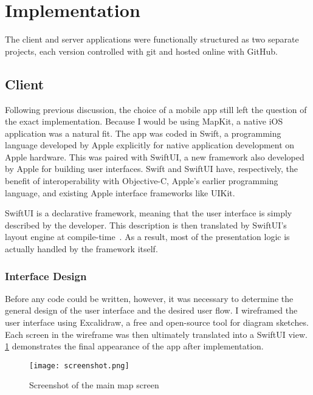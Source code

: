 \section{Implementation}

The client and server applications were functionally structured as two separate projects, each version controlled with \textsf{git} and hosted online with GitHub.  

\subsection{Client}

Following previous discussion, the choice of a mobile app still left the question of the exact implementation. Because I would be using \textsf{MapKit}, a native iOS application was a natural fit. The app was coded in Swift, a programming language developed by Apple explicitly for native application development on Apple hardware. This was paired with \textsf{SwiftUI}, a new framework also developed by Apple for building user interfaces. Swift and \textsf{SwiftUI} have, respectively, the benefit of interoperability with Objective-C, Apple's earlier programming language, and existing Apple interface frameworks like \textsf{UIKit}.

\textsf{SwiftUI} is a declarative framework, meaning that the user interface is simply described by the developer. This description is then translated by \textsf{SwiftUI}'s layout engine at compile-time~\cite{apple_2022}. As a result, most of the presentation logic is actually handled by the framework itself.

\subsubsection{Interface Design}

Before any code could be written, however, it was necessary to determine the general design of the user interface and the desired user flow. I wireframed the user interface using \textsf{Excalidraw}, a free and open-source tool for diagram sketches. Each screen in the wireframe was then ultimately translated into a \textsf{SwiftUI} view. \cref{fig:screenshot} demonstrates the final appearance of the app after implementation.

\begin{figure}
    \centering
    \texttt{[image: screenshot.png]}
    \caption{Screenshot of the main map screen}
    \label{fig:screenshot}
\end{figure}

